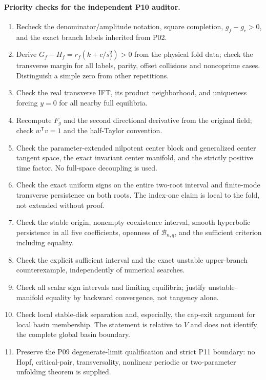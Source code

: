 \paragraph{Priority checks for the independent P10 auditor.}
\begin{enumerate}[leftmargin=*]
\item Recheck the denominator/amplitude notation, square completion,
$g_f-g_c>0$, and the exact branch labels inherited from P02.
\item Derive $G_f-H_f=r_f(k+c/s_f^2)>0$ from the physical fold data;
check the transverse margin for all labels, parity, offset collisions
and noncoprime cases. Distinguish a simple zero from other repetitions.
\item Check the real transverse IFT, its product neighborhood, and
uniqueness forcing $y=0$ for all nearby full equilibria.
\item Recompute $F_g$ and the second directional derivative from the
original field; check $w^{\mathsf T}v=1$ and the half-Taylor convention.
\item Check the parameter-extended nilpotent center block and generalized
center tangent space, the exact invariant center manifold, and the
strictly positive time factor. No full-space decoupling is used.
\item Check the exact uniform signs on the entire two-root interval
and finite-mode transverse persistence on both roots. The index-one
claim is local to the fold, not extended without proof.
\item Check the stable origin, nonempty coexistence interval, smooth
hyperbolic persistence in all five coefficients, openness of
$\mathcal B_{n,q}$, and the sufficient criterion including equality.
\item Check the explicit sufficient interval and the exact unstable
upper-branch counterexample, independently of numerical searches.
\item Check all scalar sign intervals and limiting equilibria; justify
unstable-manifold equality by backward convergence, not tangency alone.
\item Check local stable-disk separation and, especially, the cap-exit
argument for local basin membership. The statement is relative to
$V$ and does not identify the complete global basin boundary.
\item Preserve the P09 degenerate-limit qualification and strict P11
boundary: no Hopf, critical-pair, transversality, nonlinear periodic
or two-parameter unfolding theorem is supplied.
\end{enumerate}
